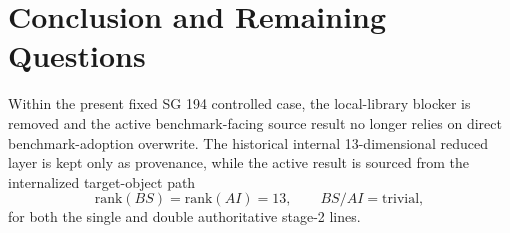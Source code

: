 \documentclass[11pt]{article}
\begin{document}
\section{Conclusion and Remaining Questions}
Within the present fixed SG 194 controlled case, the local-library blocker is removed and the active benchmark-facing source result no longer relies on direct benchmark-adoption overwrite. The historical internal 13-dimensional reduced layer is kept only as provenance, while the active result is sourced from the internalized target-object path
\[
\mathrm{rank}(BS) = \mathrm{rank}(AI) = 13,
\qquad
BS/AI = \mathrm{trivial},
\]
for both the single and double authoritative stage-2 lines.
\end{document}
